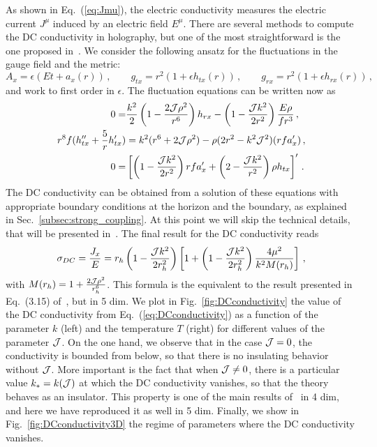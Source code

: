 \documentclass[a4paper]{jpconf}
\begin{document}
As shown in Eq.~(\ref{eq:Jmu}), the electric conductivity measures the electric current $J^\mu$ induced by an electric field $E^\mu$. There are several methods to compute the DC conductivity in holography, but one of the most straightforward is the one proposed in~\cite{Donos:2014cya}. We consider the following ansatz for the fluctuations in the gauge field and the metric:
\begin{equation}
A_x = \epsilon(E t + a_x(r))  \,, \qquad g_{tx} = r^2 (1+ \epsilon h_{tx}(r)) \,, \qquad g_{rx} = r^2 (1+ \epsilon h_{rx}(r)) \,,
\end{equation}
and work to first order in $\epsilon$. The fluctuation equations can be written now as
\begin{eqnarray}
 0= & \frac{k^2}{2} \left( 1 - \frac{2 {\cal J} \rho^2}{r^6} \right) h_{rx} - \left( 1 - \frac{{\cal J} k^2}{2r^2} \right)\frac{E \rho}{f r^3} \,, \label{eq:condhrx} \\
 r^8 f( h_{tx}'' + \frac{5}{r} h_{tx}' ) &= k^2( r^6 + 2 {\cal J} \rho^2 ) - \rho ( 2 r^2 - k^2 {\cal J}^2) (r f a_x')\,, \label{eq:condhtx} \\
 0= & \left[ \left(1 - \frac{{\cal J} k^2}{2 r^2} \right) r f a_x' + \left(2 - \frac{{\cal J} k^2}{r^2}\right) \rho h_{tx} \right]' \,.  \label{eq:condax}
\end{eqnarray}
The DC conductivity can be obtained from a solution of these equations with appropriate boundary conditions at the horizon and the boundary, as explained in Sec.~\ref{subsec:strong_coupling}. At this point we will skip the technical details, that will be presented in~\cite{workinprogress}. The final result for the DC conductivity reads
\begin{equation}
\sigma_{DC} = \frac{J_x}{E}= r_h \left(1 - \frac{{\cal J} k^2}{2 r_h^2}  \right) \left[1 + \left(1 - \frac{{\cal J} k^2}{2 r_h^2}  \right) \frac{ 4 \mu^2}{k^2 M(r_h)} \right] \,, \label{eq:DCconductivity}
\end{equation}
with $M(r_h) = 1 + \frac{2 {\cal J} \rho^2}{ r_h^6}$. This formula is the equivalent to the result presented in Eq.~(3.15) of~\cite{Gouteraux:2016wxj}, but in 5 dim. %
We plot in Fig.~\ref{fig:DCconductivity} the value of the DC conductivity from Eq.~(\ref{eq:DCconductivity}) as a function of the parameter $k$ (left) and the temperature $T$ (right) for different values of the parameter ${\cal J}$. On the one hand, we observe that in the case ${\cal J} = 0$, the conductivity is bounded from below, so that there is no insulating behavior without ${\cal J}$. More important is the fact that when ${\cal J} \ne 0$, there is a particular value $k_* = k({\cal J})$ at which the DC conductivity vanishes, so that the theory behaves as an insulator. This property is one of the main results of~\cite{Baggioli:2016oqk,Gouteraux:2016wxj} in 4 dim, and here we have reproduced it as well in 5 dim. Finally, we show in Fig.~\ref{fig:DCconductivity3D} the regime of parameters where the DC conductivity vanishes.
\end{document}
